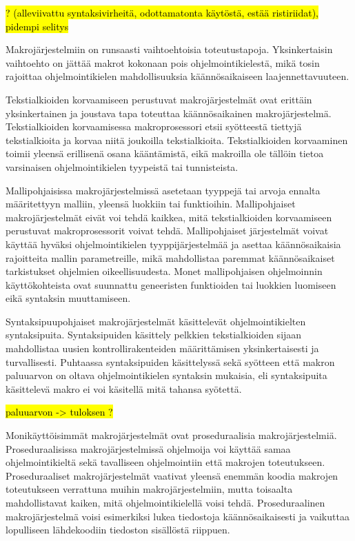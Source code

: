 \hl{? (alleviivattu syntaksivirheitä, odottamatonta käytöstä, estää
ristiriidat), pidempi selitys}

Makrojärjestelmiin on runsaasti vaihtoehtoisia toteutustapoja. Yksinkertaisin
vaihtoehto on jättää makrot kokonaan pois ohjelmointikielestä, mikä tosin
rajoittaa ohjelmointikielen mahdollisuuksia käännösaikaiseen
laajennettavuuteen.

Tekstialkioiden korvaamiseen perustuvat makrojärjestelmät ovat erittäin
yksinkertainen ja joustava tapa toteuttaa käännösaikainen makrojärjestelmä.
Tekstialkioiden korvaamisessa makroprosessori etsii syötteestä tiettyjä
tekstialkioita ja korvaa niitä joukoilla tekstialkioita. Tekstialkioiden
korvaaminen toimii yleensä erillisenä osana kääntämistä, eikä makroilla ole
tällöin tietoa varsinaisen ohjelmointikielen tyypeistä tai tunnisteista.

Mallipohjaisissa makrojärjestelmissä asetetaan tyyppejä tai arvoja ennalta
määritettyyn malliin, yleensä luokkiin tai funktioihin. Mallipohjaiset
makrojärjestelmät eivät voi tehdä kaikkea, mitä tekstialkioiden korvaamiseen
perustuvat makroprosessorit voivat tehdä. Mallipohjaiset järjestelmät voivat
käyttää hyväksi ohjelmointikielen tyyppijärjestelmää ja asettaa käännösaikaisia
rajoitteita mallin parametreille, mikä mahdollistaa paremmat käännösaikaiset
tarkistukset ohjelmien oikeellisuudesta. Monet mallipohjaisen ohjelmoinnin
käyttökohteista ovat suunnattu geneeristen funktioiden tai luokkien luomiseen
eikä syntaksin muuttamiseen.

Syntaksipuupohjaiset makrojärjestelmät käsittelevät ohjelmointikielten
syntaksipuita. Syntaksipuiden käsittely pelkkien tekstialkioiden sijaan
mahdollistaa uusien kontrollirakenteiden määrittämisen yksinkertaisesti ja
turvallisesti. Puhtaassa syntaksipuiden käsittelyssä sekä syötteen että makron
paluuarvon on oltava ohjelmointikielen syntaksin mukaisia, eli syntaksipuita
käsittelevä makro ei voi käsitellä mitä tahansa syötettä.

\hl{paluuarvon -> tuloksen ?}

Monikäyttöisimmät makrojärjestelmät ovat proseduraalisia makrojärjestelmiä.
Proseduraalisissa makrojärjestelmissä ohjelmoija voi käyttää samaa
ohjelmointikieltä sekä tavalliseen ohjelmointiin että makrojen toteutukseen.
Proseduraaliset makrojärjestelmät vaativat yleensä enemmän koodia makrojen
toteutukseen verrattuna muihin makrojärjestelmiin, mutta toisaalta
mahdollistavat kaiken, mitä ohjelmointikielellä voisi tehdä. Proseduraalinen
makrojärjestelmä voisi esimerkiksi lukea tiedostoja käännösaikaisesti ja
vaikuttaa lopulliseen lähdekoodiin tiedoston sisällöstä riippuen.

